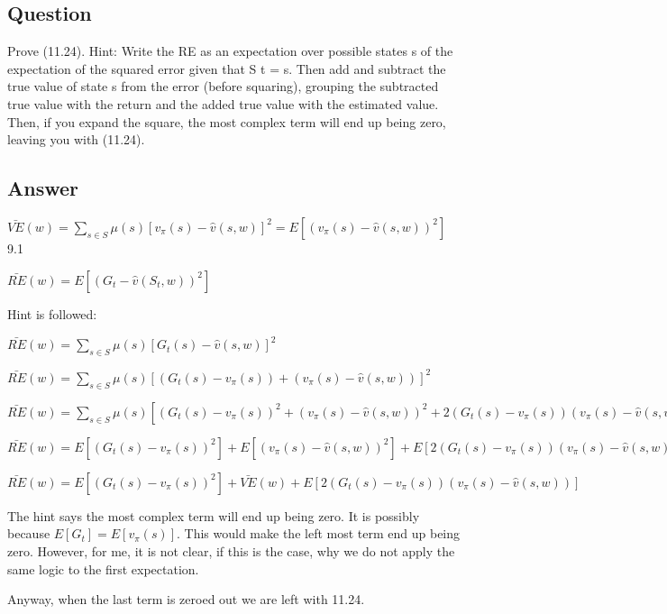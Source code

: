 \documentclass[11pt]{article}
\begin{document}
    \subsection{Question}

    Prove (11.24).
    Hint: Write the RE as an expectation over possible states s of the expectation of the squared error given that S t = s.
    Then add and subtract the true value of state s from the error (before squaring), grouping the subtracted true value with the return and the added true value with the estimated value.
    Then, if you expand the square, the most complex term will end up being zero, leaving you with (11.24).

    \subsection*{Answer}

    \noindent $ \bar{VE}(w) = \sum_{s \in S  } \mu(s) [v_\pi(s) - \hat{v}(s,w)]^2 = E [(v_\pi(s) - \hat{v}(s,w))^2] $   9.1

    \noindent $ \bar{RE}(w) = E [(G_t - \hat{v}(S_t,w))^2] $

    Hint is followed:

    \noindent $ \bar{RE}(w) = \sum_{s \in S  } \mu(s) [G_t(s) - \hat{v}(s,w)]^2 $

    \noindent $ \bar{RE}(w) = \sum_{s \in S  } \mu(s) [(G_t(s) - v_\pi(s)) + (v_\pi(s)  - \hat{v}(s,w))]^2 $

    \noindent $ \bar{RE}(w) = \sum_{s \in S  } \mu(s) [(G_t(s) - v_\pi(s))^2 + (v_\pi(s)  - \hat{v}(s,w))^2 + 2 (G_t(s) - v_\pi(s)) (v_\pi(s)  - \hat{v}(s,w))] $

    \noindent $ \bar{RE}(w) = E [(G_t(s) - v_\pi(s))^2] + E[ (v_\pi(s)  - \hat{v}(s,w))^2] +  E [2 (G_t(s) - v_\pi(s)) (v_\pi(s)  - \hat{v}(s,w))] $

    \noindent $ \bar{RE}(w) = E [(G_t(s) - v_\pi(s))^2] + \bar{VE}(w) +  E [2 (G_t(s) - v_\pi(s)) (v_\pi(s)  - \hat{v}(s,w))] $
    \hfill \break

    The hint says the most complex term will end up being zero.
    It is possibly because $ E[G_t] = E[v_\pi(s)] $.
    This would make the left most term end up being zero.
    However, for me, it is not clear, if this is the case, why we do not apply the same logic to the first expectation.

    Anyway, when the last term is zeroed out we are left with 11.24.
\end{document}

